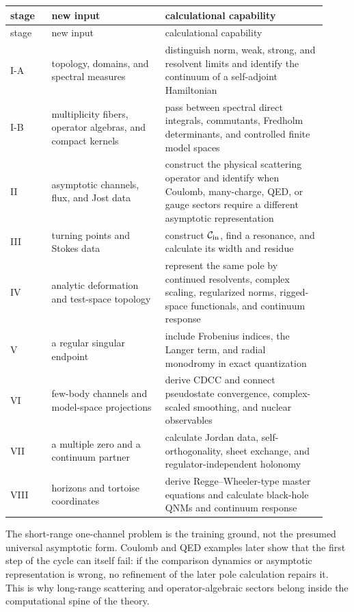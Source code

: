 \begin{longtable}{@{}p{0.12\linewidth}p{0.33\linewidth}p{0.47\linewidth}@{}}
\toprule
stage & new input & calculational capability \\
\midrule
\endfirsthead
\toprule
stage & new input & calculational capability \\
\midrule
\endhead
I-A & topology, domains, and spectral measures & distinguish norm, weak,
strong, and resolvent limits and identify the continuum of a self-adjoint
Hamiltonian \\
\addlinespace
I-B & multiplicity fibers, operator algebras, and compact kernels & pass
between spectral direct integrals, commutants, Fredholm determinants, and
controlled finite model spaces \\
\addlinespace
II & asymptotic channels, flux, and Jost data & construct the physical
scattering operator and identify when Coulomb, many-charge, QED, or gauge
sectors require a different asymptotic representation \\
\addlinespace
III & turning points and Stokes data & construct $\mathcal{C}_{\mathrm{in}}$, find a
resonance, and calculate its width and residue \\
\addlinespace
IV & analytic deformation and test-space topology & represent the same pole
by continued resolvents, complex scaling, regularized norms, rigged-space
functionals, and continuum response \\
\addlinespace
V & a regular singular endpoint & include Frobenius indices, the Langer term,
and radial monodromy in exact quantization \\
\addlinespace
VI & few-body channels and model-space projections & derive CDCC and connect
pseudostate convergence, complex-scaled smoothing, and nuclear observables \\
\addlinespace
VII & a multiple zero and a continuum partner & calculate Jordan data,
self-orthogonality, sheet exchange, and regulator-independent holonomy \\
\addlinespace
VIII & horizons and tortoise coordinates & derive Regge--Wheeler-type master
equations and calculate black-hole QNMs and continuum response \\
\bottomrule
\end{longtable}

The short-range one-channel problem is the training ground, not the presumed
universal asymptotic form.  Coulomb and QED examples later show that the first
step of the cycle can itself fail: if the comparison dynamics or asymptotic
representation is wrong, no refinement of the later pole calculation repairs
it.  This is why long-range scattering and operator-algebraic sectors belong
inside the computational spine of the theory.
